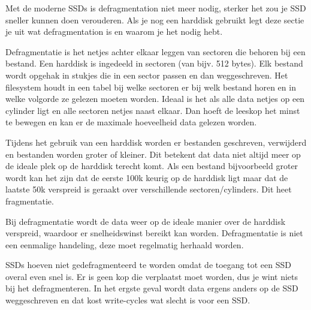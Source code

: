 Met de moderne SSDs is defragmentation niet meer nodig, sterker het zou je SSD sneller kunnen doen verouderen. Als je nog een harddisk gebruikt legt deze sectie je uit wat defragmentation is en waarom je het nodig hebt.

Defragmentatie is het netjes achter elkaar leggen van sectoren die behoren bij een bestand. Een harddisk is ingedeeld in sectoren (van bijv. 512 bytes). Elk bestand wordt opgehak in stukjes die in een sector passen en dan weggeschreven. Het filesystem houdt in een tabel bij welke sectoren er bij welk bestand horen en in welke volgorde ze gelezen moeten worden. Ideaal is het als alle data netjes op een cylinder ligt en alle sectoren netjes naast elkaar. Dan hoeft de leeskop het minst te bewegen en kan er de maximale hoeveelheid data gelezen worden.

Tijdens het gebruik van een harddisk worden er bestanden geschreven, verwijderd en bestanden worden groter of kleiner. Dit betekent dat data niet altijd meer op de ideale plek op de harddisk terecht komt. Als een bestand bijvoorbeeld groter wordt kan het zijn dat de eerste 100k keurig op de harddisk ligt maar dat de laatste 50k verspreid is geraakt over verschillende sectoren/cylinders. Dit heet fragmentatie.

Bij defragmentatie wordt de data weer op de ideale manier over de harddisk verspreid, waardoor er snelheidswinst bereikt kan worden. Defragmentatie is niet een eenmalige handeling, deze moet regelmatig herhaald worden.

\begin{minipage}[t]{\linewidth}
\raggedright
{}
\end{minipage}

SSDs hoeven niet gedefragmenteerd te worden omdat de toegang tot een SSD overal even snel is. Er is geen kop die verplaatst moet worden, dus je wint niets bij het defragmenteren. In het ergste geval wordt data ergens anders op de SSD weggeschreven en dat kost write-cycles wat slecht is voor een SSD.

